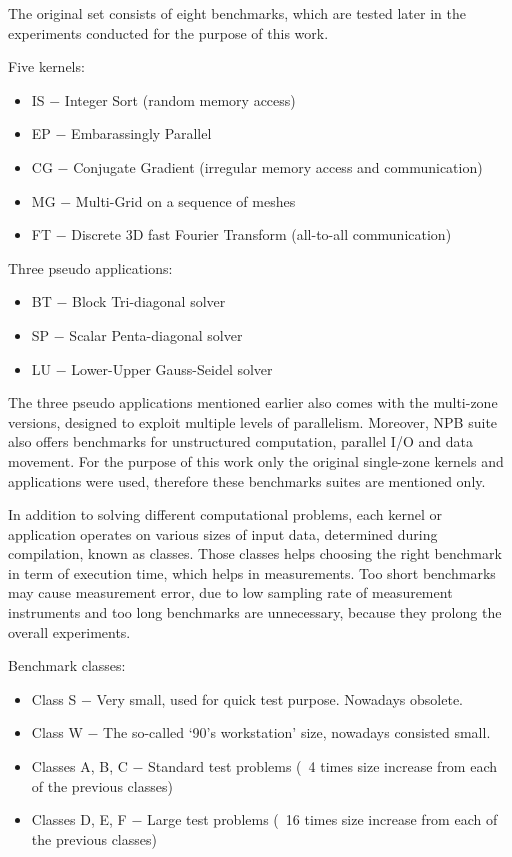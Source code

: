 The original set consists of eight benchmarks, which are tested later in the
experiments conducted for the purpose of this work.

Five kernels:
\begin{itemize}
    \item IS $-$ Integer Sort (random memory access)
    \item EP $-$ Embarassingly Parallel
    \item CG $-$ Conjugate Gradient (irregular memory access and communication)
    \item MG $-$ Multi-Grid on a sequence of meshes
    \item FT $-$ Discrete 3D fast Fourier Transform (all-to-all communication)
\end{itemize}

Three pseudo applications:
\begin{itemize}
    \item BT $-$ Block Tri-diagonal solver
    \item SP $-$ Scalar Penta-diagonal solver
    \item LU $-$ Lower-Upper Gauss-Seidel solver
\end{itemize}

The three pseudo applications mentioned earlier also comes with the multi-zone
versions, designed to exploit multiple levels of parallelism. Moreover, NPB
suite also offers benchmarks for unstructured computation, parallel I/O and
data movement. For the purpose of this work only the original single-zone
kernels and applications were used, therefore these benchmarks suites are
mentioned only.

In addition to solving different computational problems, each kernel or
application operates on various sizes of input data, determined during
compilation, known as classes. Those classes helps choosing the right benchmark
in term of execution time, which helps in measurements. Too short benchmarks may
cause measurement error, due to low sampling rate of measurement instruments and
too long benchmarks are unnecessary, because they prolong the overall experiments.

Benchmark classes:
\begin{itemize}
    \item Class S $-$ Very small, used for quick test purpose. Nowadays obsolete.
    \item Class W $-$ The so-called `90's workstation' size, nowadays consisted small.
    \item Classes A, B, C $-$ Standard test problems (~4 times size increase from
    each of the previous classes)
    \item Classes D, E, F $-$ Large test problems (~16 times size increase from
    each of the previous classes)
\end{itemize}


